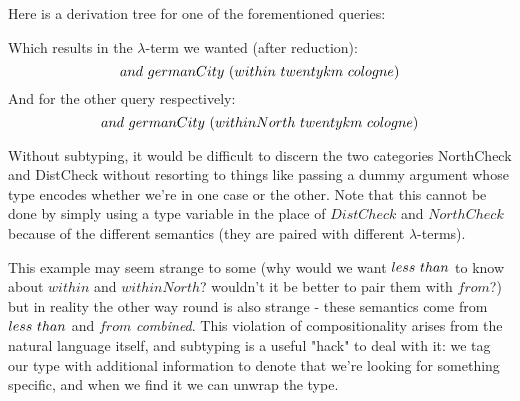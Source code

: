 \documentclass[main.tex]{subfiles}
\begin{document}
{    Here is a derivation tree for one of the forementioned queries:

    Which results in the $\lambda$-term we wanted (after reduction):
    \[ and \text{ } germanCity \text{ } (within \text{ } twentykm \text{ } cologne) \]
    And for the other query respectively:
    \[ and \text{ } germanCity \text{ } (withinNorth \text{ } twentykm \text{ } cologne) \]

    Without subtyping, it would be difficult to discern the two categories
    NorthCheck and DistCheck without resorting to things like passing a
    dummy argument whose type encodes whether we're in one case or the other.
    Note that this cannot be done by simply using a type variable in the place
    of $DistCheck$ and $NorthCheck$ because of the different semantics
    (they are paired with different $\lambda$-terms).

    This example may seem strange to some (why would
    we want $less \text{ } than$ to know about $within$ and $withinNorth$?
    wouldn't it be better to pair them with $from$?) but in reality the
    other way round is also strange - these semantics come from $less \text{ } than$
    and $from$ \emph{combined}. This violation of compositionality arises
    from the natural language itself, and subtyping is a useful "hack" to
    deal with it: we tag our type with additional information to denote that
    we're looking for something specific, and when we find it we can unwrap the
    type.
}
\end{document}

